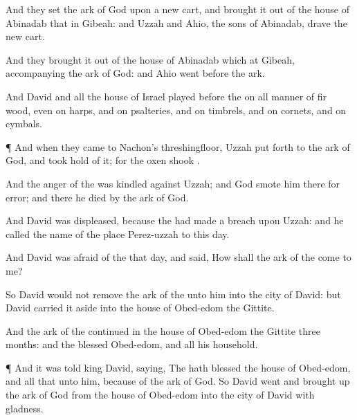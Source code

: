 {And they
set the
ark of
God upon a
new
cart, and
brought it out of the
house of
Abinadab that
{} in
Gibeah: and
Uzzah and
Ahio, the
sons of
Abinadab,
drave the
new
cart.

And they
brought it out of the
house of
Abinadab which
{} at
Gibeah,
accompanying the
ark of
God: and
Ahio
went
before the
ark.

And
David and all the
house of
Israel
played
before the
{} on all manner of
{}
fir
wood, even on
harps, and on
psalteries, and on
timbrels, and on
cornets, and on
cymbals.


\par }{\PP {}¶ And when they
came to
Nachon’s
threshingfloor,
Uzzah put
forth
{} to the
ark of
God, and took
hold of it; for the
oxen
shook
{}.

And the
anger of the
{} was
kindled against
Uzzah; and
God
smote him there for
{}
error; and there he
died by the
ark of
God.

And
David was
displeased, because the
{} had
made a
breach upon
Uzzah: and he
called the name of the
place
Perez-uzzah to this
day.

And
David was
afraid of the
{} that
day, and
said, How shall the
ark of the
{}
come to me?

So
David
would not
remove the
ark of the
{} unto him into the
city of
David: but
David carried it
aside into the
house of
Obed-edom the
Gittite.

And the
ark of the
{}
continued in the
house of
Obed-edom the
Gittite
three
months: and the
{}
blessed
Obed-edom, and all his
household.


\par }{\PP {}¶ And it was
told
king
David,
saying, The
{} hath
blessed the
house of
Obed-edom, and all that
{} unto him, because of the
ark of
God. So
David
went and brought
up the
ark of
God from the
house of
Obed-edom into the
city of
David with
gladness.

}
